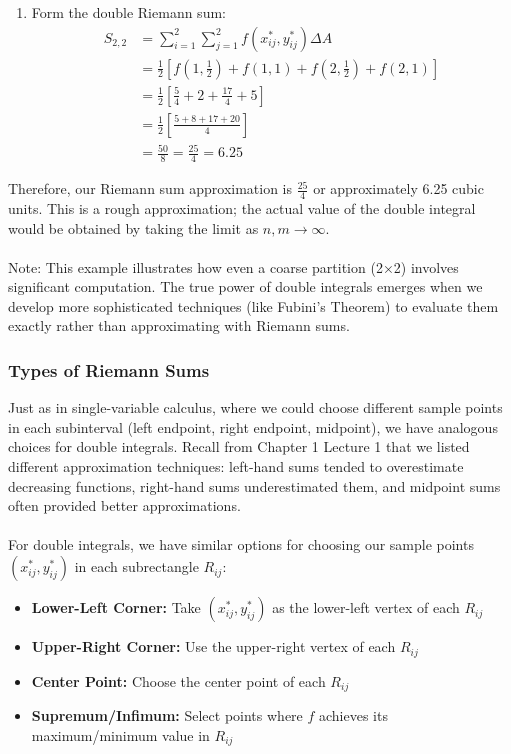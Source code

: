 \begin{example}
\begin{solution}
\begin{enumerate}
\item Form the double Riemann sum:
    \begin{align*}
    S_{2,2} &= \sum_{i=1}^2 \sum_{j=1}^2 f(x_{ij}^*, y_{ij}^*) \Delta A \\
    &= \frac{1}{2}\left[f\left(1,\frac{1}{2}\right) + f(1,1) + f\left(2,\frac{1}{2}\right) + f(2,1)\right] \\
    &= \frac{1}{2}\left[\frac{5}{4} + 2 + \frac{17}{4} + 5\right] \\
    &= \frac{1}{2}\left[\frac{5 + 8 + 17 + 20}{4}\right] \\
    &= \frac{50}{8} = \frac{25}{4} = 6.25
    \end{align*}
\end{enumerate}

\noindent Therefore, our Riemann sum approximation is \(\frac{25}{4}\) or approximately 6.25 cubic units. This is a rough approximation; the actual value of the double integral would be obtained by taking the limit as \(n,m \to \infty\). \\ \\
Note: This example illustrates how even a coarse partition (2×2) involves significant computation. The true power of double integrals emerges when we develop more sophisticated techniques (like Fubini's Theorem) to evaluate them exactly rather than approximating with Riemann sums.
\end{solution}
\end{example}
\exampleline

\subsubsection*{Types of Riemann Sums} 

\noindent Just as in single-variable calculus, where we could choose different sample points in each subinterval (left endpoint, right endpoint, midpoint), we have analogous choices for double integrals. Recall from Chapter 1 Lecture 1 that we listed different approximation techniques: left-hand sums tended to overestimate decreasing functions, right-hand sums underestimated them, and midpoint sums often provided better approximations. \\ \\
For double integrals, we have similar options for choosing our sample points \((x_{ij}^*, y_{ij}^*)\) in each subrectangle \(R_{ij}\):

\begin{itemize}
   \item \textbf{Lower-Left Corner:} Take \((x_{ij}^*, y_{ij}^*)\) as the lower-left vertex of each \(R_{ij}\)
   \item \textbf{Upper-Right Corner:} Use the upper-right vertex of each \(R_{ij}\)
   \item \textbf{Center Point:} Choose the center point of each \(R_{ij}\)
   \item \textbf{Supremum/Infimum:} Select points where \(f\) achieves its maximum/minimum value in \(R_{ij}\)
\end{itemize}

